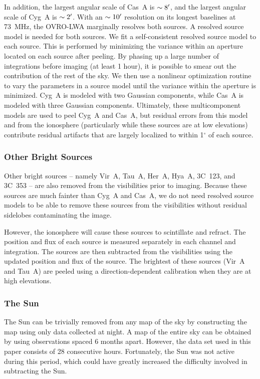 \documentclass[twocolumn]{aastex61}
\begin{document}
In addition, the largest angular scale of Cas~A is $\sim8\mbox{$^\prime$}$, and the largest angular scale of
Cyg~A is $\sim2\mbox{$^\prime$}$. With an $\sim10\mbox{$^\prime$}$ resolution on its longest baselines at 73~MHz, the
OVRO-LWA marginally resolves both sources. A resolved source model is needed for both sources. We
fit a self-consistent resolved source model to each source. This is performed by minimizing the
variance within an aperture located on each source after peeling. By phasing up a large number of
integrations before imaging (at least 1 hour), it is possible to smear out the contribution of the
rest of the sky.  We then use a nonlinear optimization routine \citep[NLopt Sbplx;][]{sbplx, nlopt}
to vary the parameters in a source model until the variance within the aperture is minimized. Cyg~A
is modeled with two Gaussian components, while Cas~A is modeled with three Gaussian components.
Ultimately, these multicomponent models are used to peel Cyg~A and Cas~A, but residual errors from
this model and from the ionosphere (particularly while these sources are at low elevations)
contribute residual artifacts that are largely localized to within 1$^\circ$ of each source.

\subsubsection{Other Bright Sources}

Other bright sources -- namely Vir~A, Tau~A, Her~A, Hya~A, 3C~123, and 3C~353 -- are also removed
from the visibilities prior to imaging. Because these sources are much fainter than Cyg~A and Cas~A,
we do not need resolved source models to be able to remove these sources from the visibilities
without residual sidelobes contaminating the image.

However, the ionosphere will cause these sources to scintillate and refract. The position and flux
of each source is measured separately in each channel and integration. The sources are then
subtracted from the visibilities using the updated position and flux of the source. The brightest of
these sources (Vir~A and Tau~A) are peeled using a direction-dependent calibration when they are at
high elevations.

\subsubsection{The Sun}

The Sun can be trivially removed from any map of the sky by constructing the map using only data
collected at night. A map of the entire sky can be obtained by using observations spaced 6 months
apart.  However, the data set used in this paper consists of 28 consecutive hours. Fortunately, the
Sun was not active during this period, which could have greatly increased the difficulty involved in
subtracting the Sun.
\end{document}
